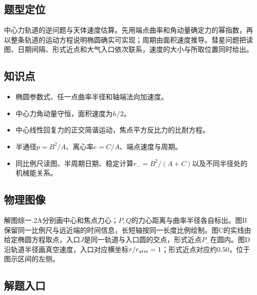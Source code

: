 \documentclass[UTF8,fontset=fandol,a4paper,11pt]{ctexart}
\begin{document}


\subsection*{题型定位}

中心力轨道的逆问题与天体速度估算。先用端点曲率和角动量确定力的幂指数，再以整条轨道的运动方程说明椭圆确实可实现；周期由面积速度推导。彗星问题把读图、日期间隔、形式近点和大气入口依次联系，速度的大小与所取位置同时给出。



\subsection*{知识点}

\begin{itemize}
\item 椭圆参数式、任一点曲率半径和轴端法向加速度。
\item 中心力角动量守恒，面积速度为$h/2$。
\item 中心线性回复力的正交简谐运动，焦点平方反比力的比耐方程。
\item 半通径$p=B^2/A$、离心率$e=C/A$、端点速度与周期。
\item 同比例尺读图、半周期日期、稳定计算$r_-=B^2/(A+C)$以及不同半径处的机械能关系。
\end{itemize}



\subsection*{物理图像}

解图综一.2A分别画中心和焦点力心；$P,Q$的力心距离与曲率半径各自标出。图B保留同一比例尺与远近端的时间信息，长短轴按同一长度比例绘制。图C的实线由给定椭圆方程取点，入口$J$是同一轨道与入口圆的交点，形式近点$P_-$在圆内。图D沿轨道半径画真空速度，入口对应横坐标$r/r_{\rm atm}=1$；形式近点对应约$0.50$，位于图示区间的左侧。



\subsection*{解题入口}
\end{document}
